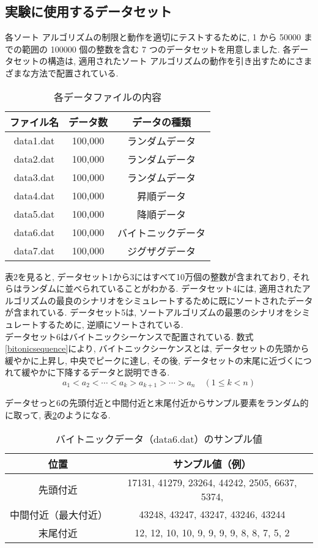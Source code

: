 \documentclass[a4j, 12pt]{jarticle}
\begin{document}
\subsection{実験に使用するデータセット}
各ソート アルゴリズムの制限と動作を適切にテストするために, 1 から 50000 までの範囲の 100000 個の整数を含む 7 つのデータセットを用意しました. 各データセットの構造は, 適用されたソート アルゴリズムの動作を引き出すためにさまざまな方法で配置されている. 
\begin{table}[htbp]
  \centering
  \caption{各データファイルの内容}
  \begin{tabular}{|c|c|c|}
    \hline
    ファイル名 & データ数 & データの種類 \\
    \hline
    data1.dat & 100,000 & ランダムデータ \\
    data2.dat & 100,000 & ランダムデータ \\
    data3.dat & 100,000 & ランダムデータ \\
    data4.dat & 100,000 & 昇順データ \\
    data5.dat & 100,000 & 降順データ \\
    data6.dat & 100,000 & バイトニックデータ \\
    data7.dat & 100,000 & ジグザグデータ \\
    \hline
  \end{tabular}\label{tab:dataset-summary}
\end{table}
表2を見ると, データセット1から3にはすべて10万個の整数が含まれており, それらはランダムに並べられていることがわかる. データセット4には, 適用されたアルゴリズムの最良のシナリオをシミュレートするために既にソートされたデータが含まれている. データセット5は, ソートアルゴリズムの最悪のシナリオをシミュレートするために, 逆順にソートされている. \\

データセット6はバイトニックシーケンスで配置されている. 数式\ref{bitonicsequence}により, バイトニックシーケンスとは, データセットの先頭から緩やかに上昇し, 中央でピークに達し, その後, データセットの末尾に近づくにつれて緩やかに下降するデータと説明できる. \\
\begin{equation}\label{bitonicsequence}
a_1 < a_2 < \cdots < a_k > a_{k+1} > \cdots > a_n
\quad (1 \leq k < n)
\end{equation}

データせっと6の先頭付近と中間付近と末尾付近からサンプル要素をランダム的に取って, 表\ref{tab:data6-sample}のようになる. 
\begin{table}[H]
  \centering
  \caption{バイトニックデータ（data6.dat）のサンプル値}
  \begin{tabular}{|c|c|}
    \hline
    位置 & サンプル値（例） \\
    \hline
    先頭付近 & 17131, 41279, 23264, 44242, 2505, 6637, 5374,\\
    中間付近（最大付近） & 43248, 43247, 43247, 43246, 43244 \\
    末尾付近 & 12, 12, 10, 10, 9, 9, 9, 9, 8, 8, 7, 5, 2 \\
    \hline
  \end{tabular}\label{tab:data6-sample}
\end{table}
\end{document}
